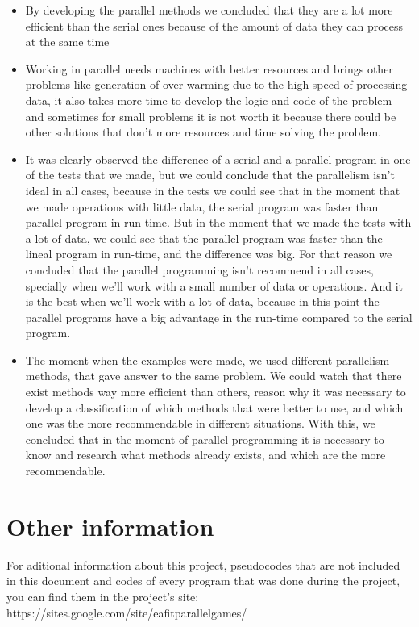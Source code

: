 \documentclass{article}
\begin{document}
\begin{itemize}

\item By developing the parallel methods we concluded that they are a lot more efficient than the serial ones because of the amount of data they can process at the same time

\item Working in parallel needs machines with better resources and brings other problems like generation of over warming due to the high speed of processing data, it also takes more time to develop the logic and code of the problem and sometimes for small problems it is not worth it because there could be other solutions that don't more resources and time solving the problem.

\item It was clearly observed the difference of a serial and a parallel program in one of the tests that we made, but we could conclude that the parallelism isn't ideal in all cases, because in the tests we could see that in the moment that we made operations with little data, the serial program was faster  than parallel program in run-time. But in the moment that we made the tests with a lot of data, we could see that the parallel program was faster than the lineal program in run-time, and the difference was big. For that reason we concluded that the parallel programming isn't  recommend in all cases, specially when we'll work with a small number of data or operations. And it is the best when we'll work with a lot of data, because in this point the parallel programs have a big advantage in the run-time compared to the serial program.

\item The moment when the examples were made, we used different parallelism methods, that gave answer to the same problem. We could watch that there exist methods way more efficient than others, reason why it  was necessary  to develop a classification of which methods that were better to use, and which one was the more recommendable in different situations. With this, we concluded that in the moment of parallel programming it is necessary to know and research what methods already exists, and which are the more recommendable.


\end{itemize}

\newpage

\section{Other information}
For aditional information about this project, pseudocodes that are not included in this document and codes of every program that was done during the project, you can find them in the project's site: https://sites.google.com/site/eafitparallelgames/
\end{document}

